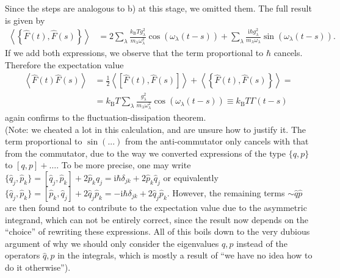 \documentclass[english, parskip=full]{scrartcl}
\newcommand{\bra}{}
\newcommand{\kla}{}
\newcommand{\klammer}{}
\newcommand{\tecxt}{}
\renewcommand{\i}{\text{i}}
\begin{document}
Since the steps are analogous to b) at this stage, we omitted them.
The full result is given by
\begin{align}
\bra\left\langle \klammer\left\{ \hat{F}(t),\hat{F}(s) \right\}  \right\rangle &= 2\sum_\lambda\frac{k_\tecxt\text{B}T g_\lambda^2}{m_\lambda\omega_\lambda^2}\cos (\omega_\lambda (t-s)) + \sum_\lambda\frac{\i\hbar g_\lambda^2}{m_\lambda\omega_\lambda}\sin\kla\left( \omega_\lambda (t-s) \right).
\end{align}
If we add both expressions, we observe that the term proportional to $\hbar$ cancels.
Therefore the expectation value
\begin{align}
\left\langle \hat{F}(t)\hat{F}(s) \right\rangle&=\frac{1}{2}\left\langle \left[\hat{F}(t), \hat{F}(s)\right] \right\rangle + \left\langle \left\{\hat{F}(t), \hat{F}(s) \right\} \right\rangle =\\
&=  k_\tecxt\text{B}T \sum_\lambda\frac{ g_\lambda^2}{m_\lambda\omega_\lambda^2}\cos (\omega_\lambda (t-s))\equiv k_\tecxt\text{B}T\Gamma(t-s)
\end{align}
again confirms to the fluctuation-dissipation theorem.\\
(Note: we cheated a lot in this calculation, and are unsure how to justify it. 
The term proportional to $\sin(...)$ from the anti-commutator only cancels with that from the commutator, due to the way we converted expressions of the type $\{q,p\}$ to $[q,p]+\dots$.
To be more precise, one may write $\{\hat{q}_j,\hat{p}_k\}=[\hat{q}_j,\hat{p}_k]+2\hat{p}_k\hat{q}_j=\i\hbar\delta_{jk}+2\hat{p}_k\hat{q}_j$ or equivalently $\{\hat{q}_j,\hat{p}_k\}=[\hat{p}_k,\hat{q}_j]+ 2\hat{q}_j\hat{p}_k=-\i\hbar\delta_{jk} + 2\hat{q}_j\hat{p}_k$.
However, the remaining terms $\sim\hat{q}\hat{p}$ are then found not to contribute to the expectation value due to the asymmetric integrand, which can not be entirely correct, since the result now depends on the ``choice'' of rewriting these expressions.
All of this boils down to the very dubious argument of why we should only consider the eigenvalues $q,p$ instead of the operators $\hat{q},\hat{p}$ in the integrals, which is mostly a result of ``we have no idea how to do it otherwise'').

\newpage
\end{document}
